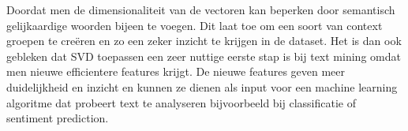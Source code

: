 Doordat men de dimensionaliteit van de vectoren kan beperken door semantisch gelijkaardige woorden bijeen te voegen. Dit laat toe om een soort van context groepen te cre\"eren en zo een zeker inzicht te krijgen in de dataset. Het is dan ook gebleken dat  SVD toepassen een zeer nuttige eerste stap is bij text mining \cite{maas2011learning} omdat men nieuwe efficientere features krijgt. De nieuwe features geven meer duidelijkheid en inzicht en kunnen ze dienen als input voor een machine learning algoritme dat probeert text te analyseren bijvoorbeeld bij classificatie of sentiment prediction. 



